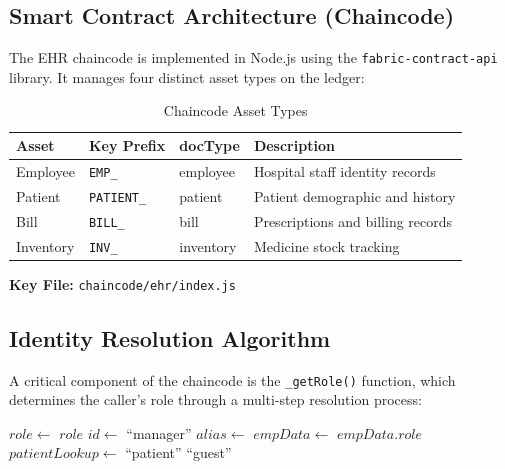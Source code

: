 \subsection{Smart Contract Architecture (Chaincode)}

The EHR chaincode is implemented in Node.js using the \texttt{fabric-contract-api} library. It manages four distinct asset types on the ledger:

\begin{table}[h]
\centering
\caption{Chaincode Asset Types}
\label{tab:asset_types}
\begin{tabular}{|l|l|l|p{4.5cm}|}
\hline
\textbf{Asset} & \textbf{Key Prefix} & \textbf{docType} & \textbf{Description} \\
\hline
Employee & \texttt{EMP\_} & employee & Hospital staff identity records \\
\hline
Patient & \texttt{PATIENT\_} & patient & Patient demographic and history \\
\hline
Bill & \texttt{BILL\_} & bill & Prescriptions and billing records \\
\hline
Inventory & \texttt{INV\_} & inventory & Medicine stock tracking \\
\hline
\end{tabular}
\end{table}

\textbf{Key File:} \texttt{chaincode/ehr/index.js}

\subsection{Identity Resolution Algorithm}

A critical component of the chaincode is the \texttt{\_getRole()} function, which determines the caller's role through a multi-step resolution process:

\begin{algorithm}[H]
\caption{Identity Resolution and Role Detection}
\label{alg:identity}
\begin{algorithmic}[1]
    \State $role \gets$ 
        \State \Return $role$ 
    \EndIf
    \State $id \gets$ 
        \State \Return ``manager''
    \EndIf
    \State $alias \gets$  
    \State $empData \gets$ 
        \State \Return $empData.role$ 
    \EndIf
    \State $patientLookup \gets$ 
        \State \Return ``patient'' 
    \EndIf
    \State \Return ``guest'' 
\EndProcedure
\end{algorithmic}
\end{algorithm}

